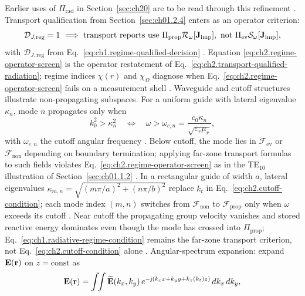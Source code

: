 Earlier uses of \(\Pi_{\mathrm{rad}}\) in Section~\ref{sec:ch20} are to be read through this
refinement \cite{stratton1941}. Transport qualification from Section~\ref{sec:ch01.2.4} enters as an operator criterion:
\begin{equation}
\label{eq:ch2.regime-operator-screen}
\mathcal{D}_{J,\mathrm{reg}}=1
\ \Longrightarrow\
\text{transport reports use}\ 
\Pi_{\mathrm{prop}}\mathcal{R}_\omega[\Jimp],
\ \text{not}\ \Pi_{\mathrm{ev}}\mathcal{S}_\omega[\Jimp],
\end{equation}
with \(\mathcal{D}_{J,\mathrm{reg}}\) from
Eq.~\eqref{eq:ch1.regime-qualified-decision} \cite{stratton1941}. Equation
\eqref{eq:ch2.regime-operator-screen} is the operator restatement of
Eq.~\eqref{eq:ch2.transport-qualified-radiation}; regime indices \(\chi(r)\) and
\(\chi_\Omega\) diagnose when Eq.~\eqref{eq:ch2.regime-operator-screen} fails on a
measurement shell \cite{stratton1941}.
Waveguide and cutoff structures illustrate non-propagating subspaces. For a uniform
guide with lateral eigenvalue \(\kappa_n\), mode \(n\) propagates only when
\begin{equation}
\label{eq:ch2.cutoff-condition}
k_0^2>\kappa_n^2
\quad\Longleftrightarrow\quad
\omega>\omega_{c,n}=\frac{c_0\kappa_n}{\sqrt{\varepsilon_r\mu_r}},
\end{equation}
with \(\omega_{c,n}\) the cutoff angular frequency \cite{stratton1941}. Below
cutoff, the mode lies in \(\mathcal{F}_{\mathrm{ev}}\) or
\(\mathcal{F}_{\mathrm{non}}\) depending on boundary termination; applying far-zone
transport formulas to such fields violates Eq.~\eqref{eq:ch2.regime-operator-screen}
as in the TE\(_{10}\) illustration of Section~\ref{sec:ch01.1.2}
\cite{harrington2001}. In a rectangular guide of width \(a\), lateral eigenvalues
\(\kappa_{m,n}=\sqrt{(m\pi/a)^2+(n\pi/b)^2}\) replace \(k_t\) in
Eq.~\eqref{eq:ch2.cutoff-condition}; each mode index \((m,n)\) switches from
\(\mathcal{F}_{\mathrm{non}}\) to \(\mathcal{F}_{\mathrm{prop}}\) only when
\(\omega\) exceeds its cutoff \cite{stratton1941}. Near cutoff the propagating
group velocity vanishes and stored reactive energy dominates even though the mode
has crossed into \(\Pi_{\mathrm{prop}}\); Eq.~\eqref{eq:ch1.radiative-regime-condition}
remains the far-zone transport criterion, not Eq.~\eqref{eq:ch2.cutoff-condition} alone
\cite{harrington2001}.
Angular-spectrum expansion: expand \(\mathbf{E}(\mathbf{r})\) on \(z=\mathrm{const}\) as
\begin{equation}
\label{eq:ch2.angular-spectrum}
\mathbf{E}(\mathbf{r})
=
\int\!\!\int \widetilde{\mathbf{E}}(k_x,k_y)\,
e^{-\mathrm{j}(k_x x+k_y y+k_z(k_t) z)}\,dk_x\,dk_y,
\end{equation}
